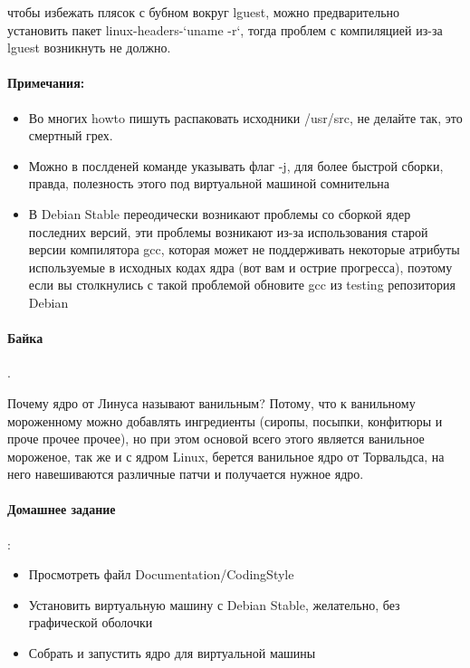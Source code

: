 чтобы избежать плясок с бубном вокруг lguest, можно предварительно установить пакет linux-headers-`uname -r`, тогда проблем с компиляцией из-за lguest
возникнуть не должно.

\paragraph{Примечания:}

\begin{itemize}
\item Во многих howto пишуть распаковать исходники /usr/src, не делайте так, это смертный грех.

\item Можно в послденей команде указывать флаг -j, для более быстрой сборки, правда, полезность этого под виртуальной машиной сомнительна

\item В Debian Stable переодически возникают проблемы со сборкой ядер последних версий, эти проблемы возникают из-за использования старой версии
компилятора gcc, которая может не поддерживать некоторые атрибуты используемые в исходных кодах ядра (вот вам и острие прогресса), поэтому если вы столкнулись
с такой проблемой обновите gcc из testing репозитория Debian 
\end{itemize}

\paragraph{Байка}.

Почему ядро от Линуса называют ванильным? Потому, что к ванильному мороженному можно добавлять ингредиенты (сиропы, посыпки,
конфитюры и проче прочее прочее), но при этом основой всего этого является ванильное мороженое, так же и с ядром Linux, берется
ванильное ядро от Торвальдса, на него навешиваются различные патчи и получается нужное ядро.

\paragraph{Домашнее задание}:

\begin{itemize}
\item Просмотреть файл Documentation/CodingStyle

\item Установить виртуальную машину с Debian Stable, желательно, без графической оболочки

\item Собрать и запустить ядро для виртуальной машины
\end{itemize}